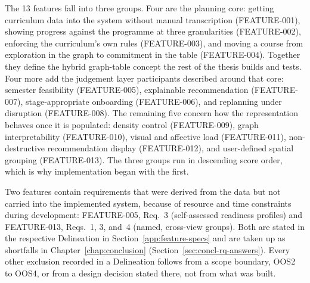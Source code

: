 The 13 features fall into three groups. Four are the planning core: getting curriculum data into the system without manual transcription (FEATURE-001), showing progress against the programme at three granularities (FEATURE-002), enforcing the curriculum's own rules (FEATURE-003), and moving a course from exploration in the graph to commitment in the table (FEATURE-004). Together they define the hybrid graph-table concept the rest of the thesis builds and tests. Four more add the judgement layer participants described around that core: semester feasibility (FEATURE-005), explainable recommendation (FEATURE-007), stage-appropriate onboarding (FEATURE-006), and replanning under disruption (FEATURE-008). The remaining five concern how the representation behaves once it is populated: density control (FEATURE-009), graph interpretability (FEATURE-010), visual and affective load (FEATURE-011), non-destructive recommendation display (FEATURE-012), and user-defined spatial grouping (FEATURE-013). The three groups run in descending score order, which is why implementation began with the first.

Two features contain requirements that were derived from the data but not carried into the implemented system, because of resource and time constraints during development: FEATURE-005, Req.~3 (self-assessed readiness profiles) and FEATURE-013, Reqs.~1, 3, and~4 (named, cross-view groups). Both are stated in the respective Delineation in Section~\ref{app:feature-specs} and are taken up as shortfalls in Chapter~\ref{chap:conclusion} (Section~\ref{sec:concl-rq-answers}). Every other exclusion recorded in a Delineation follows from a scope boundary, OOS2 to OOS4, or from a design decision stated there, not from what was built.

